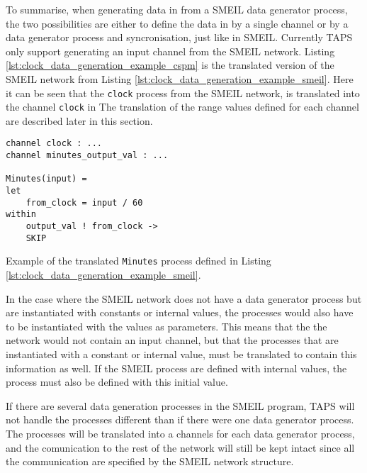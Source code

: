 To summarise, when generating data in \cspm{} from a SMEIL data generator process, the two possibilities are either to define the data in \cspm by a single channel or by a data generator process and syncronisation, just like in SMEIL.
Currently TAPS only support generating an input channel from the SMEIL network.
Listing \ref{lst:clock_data_generation_example_cspm} is the translated version of the SMEIL network from Listing \ref{lst:clock_data_generation_example_smeil}. Here it can be seen that the \texttt{clock} process from the SMEIL network, is translated into the channel \texttt{clock} in \cspm{}
The translation of the range values defined for each channel are described later in this section.
\begin{listing}
\begin{verbatim}
channel clock : ...
channel minutes_output_val : ...

Minutes(input) =
let
    from_clock = input / 60
within
    output_val ! from_clock ->
    SKIP

\end{verbatim}
\caption{Example of the translated \texttt{Minutes} process defined in Listing \ref{lst:clock_data_generation_example_smeil}.}
\label{lst:clock_data_generation_example_cspm}
\end{listing}
In the case where the SMEIL network does not have a data generator process but are instantiated with constants or internal values, the \cspm processes would also have to be instantiated with the values as parameters. This means that the the \cspm{} network would not contain an input channel, but that the processes that are instantiated with a constant or internal value, must be translated to contain this information as well.
If the SMEIL process are defined with internal values, the \cspm{} process must also be defined with this initial value.


If there are several data generation processes in the SMEIL program, TAPS will not handle the processes different than if there were one data generator process. The processes will be translated into a \cspm channels for each data generator process, and the comunication to the rest of the network will still be kept intact since all the communication are specified by the SMEIL network structure.


